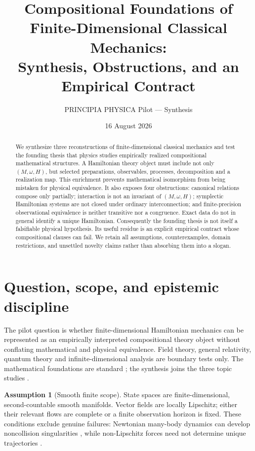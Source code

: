 \documentclass[12pt,a4paper]{article}
\title{\bf Compositional Foundations of Finite-Dimensional Classical Mechanics:\\
Synthesis, Obstructions, and an Empirical Contract}
\author{PRINCIPIA PHYSICA Pilot --- Synthesis}
\date{16 August 2026}
\theoremstyle{definition}
\newtheorem{assumption}[definition]{Assumption}
\theoremstyle{plain}
\theoremstyle{commentary}
\begin{document}
\maketitle
\begin{abstract}
We synthesize three reconstructions of finite-dimensional classical mechanics and test the
founding thesis that physics studies empirically realized compositional mathematical
structures.  A Hamiltonian theory object must include not only $(M,\omega,H)$, but selected
preparations, observables, processes, decomposition and a realization map.  This enrichment
prevents mathematical isomorphism from being mistaken for physical equivalence.  It also
exposes four obstructions: canonical relations compose only partially; interaction is not an
invariant of $(M,\omega,H)$; symplectic Hamiltonian systems are not closed under ordinary
interconnection; and finite-precision observational equivalence is neither transitive nor a
congruence.  Exact data do not in general identify a unique Hamiltonian.  Consequently the
founding thesis is not itself a falsifiable physical hypothesis.  Its useful residue is an
explicit empirical contract whose compositional clauses can fail.  We retain all assumptions,
counterexamples, domain restrictions, and unsettled novelty claims rather than absorbing them
into a slogan.
\end{abstract}

\section{Question, scope, and epistemic discipline}

The pilot question is whether finite-dimensional Hamiltonian mechanics can be represented as
an empirically interpreted compositional theory object without conflating mathematical and
physical equivalence.  Field theory, general relativity, quantum theory and infinite-dimensional
analysis are boundary tests only.  The mathematical foundations are standard
\cite{AbrahamMarsden1978,Arnold1989}; the synthesis joins the three topic studies
\cite{PilotI,PilotII,PilotIII}.

\begin{assumption}[Smooth finite scope]\label{asm:scope}
State spaces are finite-dimensional, second-countable smooth manifolds.  Vector fields are
locally Lipschitz; either their relevant flows are complete or a finite observation horizon is
fixed.  These conditions exclude genuine failures: Newtonian many-body dynamics can develop
noncollision singularities \cite{Xia1992}, while non-Lipschitz forces need not determine unique
trajectories \cite{Norton2008}.
\end{assumption}
\end{document}

